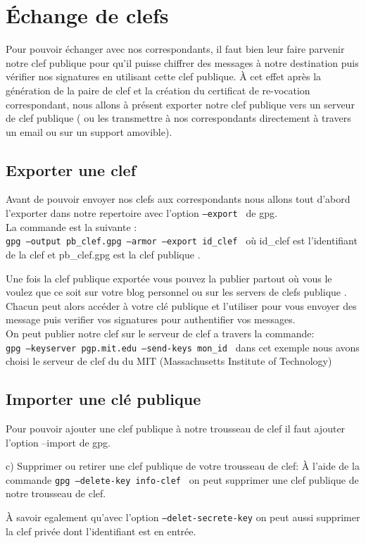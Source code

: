 \section{Échange de clefs}






Pour pouvoir échanger avec nos correspondants, il faut bien leur faire parvenir notre clef publique pour qu'il puisse chiffrer des
messages à notre destination puis vérifier nos signatures en utilisant cette clef publique. À cet effet après la génération de la 
paire de clef et la création du certificat de re-vocation correspondant, nous allons à présent exporter notre clef publique vers un 
serveur de clef publique ( ou les transmettre à nos correspondants directement à travers un email ou sur un support amovible).

\subsection{Exporter une clef}
Avant de pouvoir envoyer nos clefs aux correspondants nous allons tout d'abord l'exporter dans notre repertoire avec l'option
 \texttt{--export } de gpg.\\
La commande est la suivante : \\


\texttt{gpg --output pb\_clef.gpg --armor --export id\_clef } où id\_clef est l'identifiant de la clef et pb\_clef.gpg est la clef 
publique . 

Une fois la clef publique exportée vous pouvez la publier partout où vous le voulez que ce soit sur votre blog personnel ou sur les 
servers de clefs publique . Chacun peut alors accéder à votre clé publique et l'utiliser pour vous envoyer des message puis verifier 
vos signatures pour authentifier vos messages.\\

On peut publier notre clef sur le serveur de clef a travers la commande:\\

\texttt{gpg --keyserver pgp.mit.edu --send-keys  mon\_id } dans cet exemple nous avons choisi le serveur de clef du du MIT
  (Massachusetts Institute of Technology)
\subsection{Importer une clé publique}


Pour pouvoir ajouter une clef publique à notre trousseau de clef il faut ajouter l'option --import  de gpg.


c) Supprimer ou retirer une clef publique de votre trousseau de clef:
À l'aide de la commande \texttt{gpg --delete-key info-clef } on peut supprimer une clef publique de notre trousseau de clef.

À savoir egalement qu'avec l'option \texttt{--delet-secrete-key} on peut aussi supprimer la clef privée dont l'identifiant est en entrée.


